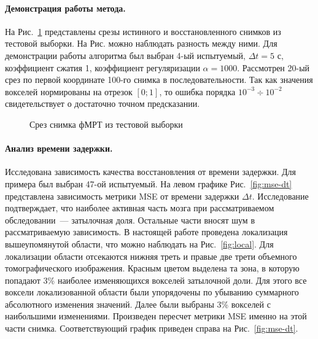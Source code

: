 \documentclass[a4paper, 12pt]{extarticle}
\begin{document}
\paragraph*{Демонстрация работы метода.}

На Рис.~\ref*{fig:example} представлены срезы истинного и восстановленного снимков из
тестовой выборки. На Рис. можно наблюдать разность между ними.
Для демонстрации работы алгоритма был выбран 4-ый испытуемый, $\Delta t = 5 \text{ с}$, коэффициент сжатия 1, коэффициент регуляризации
$\alpha = 1000$. Рассмотрен 20-ый срез по первой координате 100-го снимка в последовательности.
Так как значения вокселей нормированы на отрезок $[0; 1]$, то ошибка порядка $10^{-3} \div 10^{-2}$
свидетельствует о достаточно точном предсказании.

\begin{figure}[h!]
	\centering
	\hfill
	\hfill
	\caption{Срез снимка фМРТ из тестовой выборки}
	\label{fig:example}
\end{figure}

\paragraph*{Анализ времени задержки.}

Исследована зависимость качества восстановления от времени задержки.
Для примера был выбран 47-ой испытуемый.
На левом графике Рис.~\ref{fig:mse-dt} представлена зависимость метрики MSE
от времени задержки $\Delta t$.
Исследование \citep{anderson2006} подтверждает, что наиболее активная часть мозга
при рассматриваемом обследовании~--- затылочная доля.
Остальные части вносят шум в рассматриваемую зависимость.
В настоящей работе проведена локализация вышеупомянутой области, 
что можно наблюдать на Рис.~\ref{fig:local}.
Для локализации области отсекаются нижняя треть и правые две трети объемного
томографического изображения.
Красным цветом выделена та зона, в которую попадают 3\% наиболее 
изменяющихся вокселей затылочной доли.
Для этого все воксели локализованной области были упорядочены по 
убыванию суммарного абсолютного изменения значений.
Далее были выбраны 3\% вокселей с наибольшими изменениями.
Произведен пересчет метрики MSE именно на этой части снимка.
Соответствующий график приведен справа на Рис.~\ref{fig:mse-dt}.
\end{document}
